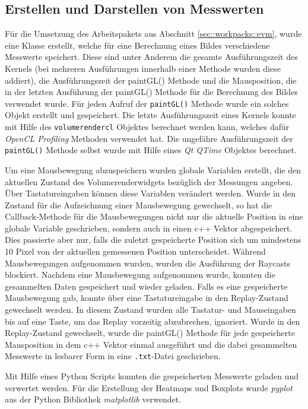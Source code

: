 \subsection{Erstellen und Darstellen von Messwerten}
Für die Umsetzung des Arbeitspakets aus Abschnitt \ref{sec::workpacks::evm}, wurde eine Klasse erstellt, welche für eine Berechnung eines Bildes verschiedene Messwerte speichert.
Diese sind unter Anderem die gesamte Ausführungszeit des Kernels (bei mehreren Ausführungen innerhalb einer Methode wurden diese addiert), die Ausführungszeit der paintGL() Methode und die Mausposition, die in der letzten Ausführung der paintGL() Methode für die Berechnung des Bildes verwendet wurde.
Für jeden Aufruf der \texttt{paintGL()} Methode wurde ein solches Objekt erstellt und gespeichert.
Die letzte Ausführungszeit eines Kernels konnte mit Hilfe des \texttt{volumerendercl} Objektes berechnet werden kann, welches dafür \emph{OpenCL Profiling} Methoden verwendet hat.
Die ungefähre Ausführungszeit der \texttt{paintGL()} Methode selbst wurde mit Hilfe eines \emph{Qt QTime} Objektes berechnet.

Um eine Mausbewegung abzuspeichern wurden globale Variablen erstellt, die den aktuellen Zustand des Volumerenderwidgets bezüglich der Messungen angeben.
Über Tastatureingaben können diese Variablen verändert werden.
Wurde in den Zustand für die Aufzeichnung einer Mausbewegung gewechselt, so hat die Callback-Methode für die Mausbewegungen nicht nur die aktuelle Position in eine globale Variable geschrieben, sondern auch in einen c++ Vektor abgespeichert.
Dies passierte aber nur, falls die zuletzt gespeicherte Position sich um mindestens 10 Pixel von der aktuellen gemessenen Position unterscheidet.
Während Mausbewegungen aufgenommen wurden, wurden die Ausführung der Raycasts blockiert.
Nachdem eine Mausbewegung aufgenommen wurde, konnten die gesammelten Daten gespeichert und wieder geladen.
Falls es eine gespeicherte Mausbewegung gab, konnte über eine Tastatureingabe in den Replay-Zustand gewechselt werden.
In diesem Zustand wurden alle Tastatur- und Mauseingaben bis auf eine Taste, um das Replay vorzeitig abzubrechen, ignoriert.
Wurde in den Replay-Zustand gewechselt, wurde die paintGL() Methode für jede gespeicherte Mausposition in dem c++ Vektor einmal ausgeführt und die dabei gesammelten Messwerte in lesbarer Form in eine \texttt{.txt}-Datei geschrieben.

Mit Hilfe eines Python Scripts konnten die gespeicherten Messwerte geladen und verwertet werden.
Für die Erstellung der Heatmaps und Boxplots wurde \emph{pyplot} aus der Python Bibliothek \emph{matplotlib} verwendet.